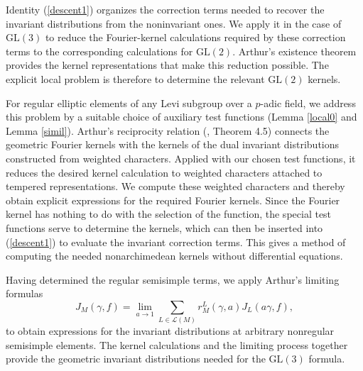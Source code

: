 \documentclass[11pt]{amsart}
\theoremstyle{definition}
\numberwithin{equation}{section}
\begin{document}
	Identity (\ref{descent1}) organizes the correction terms needed to recover the invariant distributions from the noninvariant ones. We apply it in the case of \(\mathrm{GL}(3)\) to reduce the Fourier-kernel calculations required by these correction terms to the corresponding calculations for \(\mathrm{GL}(2)\). Arthur’s existence theorem provides the kernel representations that make this reduction possible. The explicit local problem is therefore to determine the relevant \(\mathrm{GL}(2)\) kernels.
	
	For regular elliptic elements of any Levi subgroup over a \(p\)-adic field, we address this problem by a suitable choice of auxiliary test functions (Lemma \ref{local0} and Lemma \ref{simil}). Arthur’s reciprocity relation (\cite{Art94}, Theorem 4.5) connects the geometric Fourier kernels with the kernels of the dual invariant distributions constructed from weighted characters. Applied with our chosen test functions, it reduces the desired kernel calculation to weighted characters attached to tempered representations. We compute these weighted characters and thereby obtain explicit expressions for the required Fourier kernels. Since the Fourier kernel has nothing to do with the selection of the function, the special test functions serve to determine the kernels, which can then be inserted into (\ref{descent1}) to evaluate the invariant correction terms. This gives a method of computing the needed nonarchimedean kernels without differential equations.
	
	Having determined the regular semisimple terms, we apply Arthur’s limiting formulas
		\[J_M(\gamma, f) = \lim_{a \to 1} \sum_{L \in \mathcal{L}(M)} r_M^L(\gamma, a) J_L(a\gamma, f),\]
	 to obtain expressions for the invariant distributions at arbitrary nonregular semisimple elements. The kernel calculations and the limiting process together provide the geometric invariant distributions needed for the \(\mathrm{GL}(3)\) formula.
\end{document}
